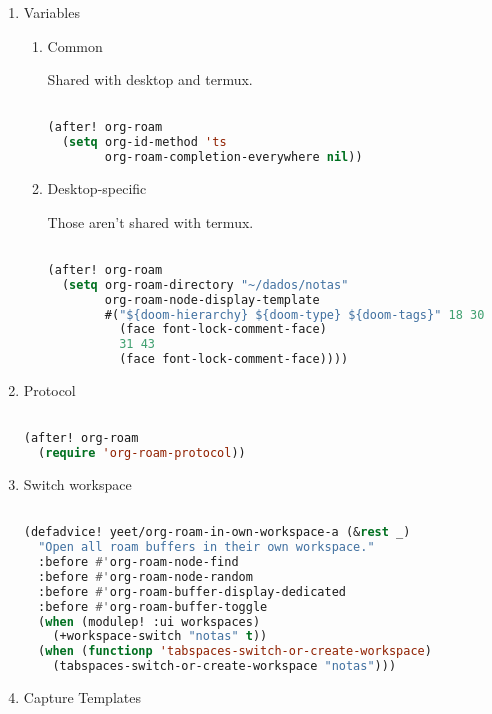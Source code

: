 \documentclass[11pt]{article}
\begin{document}
\begin{enumerate}
  \item Variables
  \label{sec:variables-2}

  
\begin{enumerate}
  \item Common
  \label{sec:common}

  Shared with desktop and termux.

\begin{lstlisting}[language=Lisp]%! Someone please complete this list for me

(after! org-roam
  (setq org-id-method 'ts
        org-roam-completion-everywhere nil))
\end{lstlisting}
  \item Desktop-specific
  \label{sec:desktop-specific}

  Those aren’t shared with termux.

\begin{lstlisting}[language=Lisp]%! Someone please complete this list for me

(after! org-roam
  (setq org-roam-directory "~/dados/notas"
        org-roam-node-display-template
        #("${doom-hierarchy} ${doom-type} ${doom-tags}" 18 30
          (face font-lock-comment-face)
          31 43
          (face font-lock-comment-face))))
\end{lstlisting}
\end{enumerate}

  \item Protocol
  \label{sec:protocol}

  \begin{lstlisting}[language=Lisp]%! Someone please complete this list for me

(after! org-roam
  (require 'org-roam-protocol))
\end{lstlisting}
  \item Switch workspace
  \label{sec:switch-workspace}

  \begin{lstlisting}[language=Lisp]%! Someone please complete this list for me

(defadvice! yeet/org-roam-in-own-workspace-a (&rest _)
  "Open all roam buffers in their own workspace."
  :before #'org-roam-node-find
  :before #'org-roam-node-random
  :before #'org-roam-buffer-display-dedicated
  :before #'org-roam-buffer-toggle
  (when (modulep! :ui workspaces)
    (+workspace-switch "notas" t))
  (when (functionp 'tabspaces-switch-or-create-workspace)
    (tabspaces-switch-or-create-workspace "notas")))
\end{lstlisting}
  \item Capture Templates
  \label{sec:capture-templates}


\end{enumerate}
\end{document}
